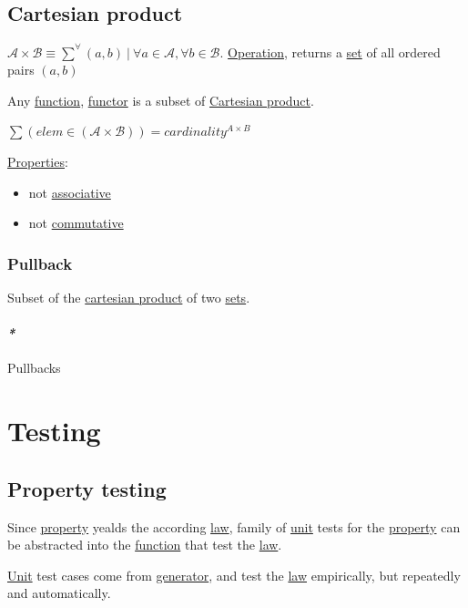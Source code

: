 \documentclass[a4paper,14pt,oneside]{book}
\begin{document}
\section{\label{org56764da}Cartesian product}
\label{sec:org1ca35cf}
\(\mathcal{A} \times \mathcal{B} \equiv \sum^{\forall}{(a,b)} \ | \ \forall a \in \mathcal{A}, \forall b \in \mathcal{B}\).
\hyperref[orgb0a7f4c]{Operation}, returns a \hyperref[orgb802935]{set} of all ordered pairs \((a, b)\)

Any \hyperref[org27c946d]{function}, \hyperref[orgc667983]{functor} is a subset of \hyperref[org56764da]{Cartesian product}.

\(\sum{(elem \in (\mathcal{A} \times \mathcal{B}))}  = cardinality^{A \times B}\)

\hyperref[org2e72dee]{Properties}:
\begin{itemize}
\item not \hyperref[org4101409]{associative}
\item not \hyperref[orgc5e26e4]{commutative}
\end{itemize}

\subsection{\label{org751b236}Pullback}
\label{sec:orga1b99ec}
Subset of the \hyperref[org56764da]{cartesian product} of two \hyperref[org6f2e819]{sets}.

\subsubsection{\emph{*}}
\label{sec:org682df86}
\label{org4448078}Pullbacks

\chapter{\label{orgb8cb0ed}Testing}
\label{sec:orgc95c286}
\section{\label{orgbf37195}Property testing}
\label{sec:orgc195549}

Since \hyperref[orgcd82c84]{property} yealds the according \hyperref[orgc42595d]{law}, family of \hyperref[orgbf79620]{unit} tests for the \hyperref[orgcd82c84]{property} can be abstracted into the \hyperref[org27c946d]{function} that test the \hyperref[orgc42595d]{law}.

\hyperref[orgbf79620]{Unit} test cases come from \hyperref[orgc680a74]{generator}, and test the \hyperref[orgc42595d]{law} empirically, but repeatedly and automatically.
\end{document}
